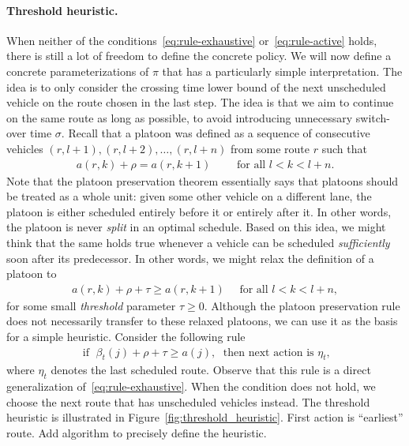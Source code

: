\documentclass[a4paper]{report}
\theoremstyle{definition}
\theoremstyle{plain}
\newcommand\note[1]{{\color{Navy}#1}}
\begin{document}
\paragraph{Threshold heuristic.}
When neither of the conditions~\eqref{eq:rule-exhaustive}
or~\eqref{eq:rule-active} holds, there is still a lot of freedom to define the
concrete policy.
%
We will now define a concrete parameterizations of $\pi$ that has a particularly
simple interpretation.
%
The idea is to only consider the crossing time lower bound of the next
unscheduled vehicle on the route chosen in the last step. The idea is that we
aim to continue on the same route as long as possible, to avoid introducing
unnecessary switch-over time $\sigma$.
%
Recall that a platoon was defined as a sequence of consecutive vehicles
$(r, l+1), (r, l+2), \dots, (r, l+n)$ from some route $r$ such that
\begin{align*}
  a(r,k) + \rho = a(r, k+1)  \quad \quad \text{ for all } l < k < l + n.
\end{align*}
%
Note that the platoon preservation theorem essentially says that platoons should
be treated as a whole unit: given some other vehicle on a different lane, the
platoon is either scheduled entirely before it or entirely after it. In other
words, the platoon is never \emph{split} in an optimal schedule.
Based on this idea, we might think that the same holds true whenever a vehicle
can be scheduled \textit{sufficiently} soon after its predecessor.
%
In other words, we might relax the definition of a platoon to
\begin{align}
  a(r,k) + \rho + \tau \geq a(r, k + 1) \quad \text{ for all } l < k < l + n,
\end{align}
for some small \emph{threshold} parameter $\tau \geq 0$.
%
Although the platoon preservation rule does not necessarily transfer to these
relaxed platoons, we can use it as the basis for a simple heuristic.
%
Consider the following rule
\begin{align}
  \text{ if } \; \beta_t(j) + \rho + \tau \geq a(j) , \; \text{ then next action is } \eta_t ,
\end{align}
where $\eta_t$ denotes the last scheduled route. Observe that this rule is a
direct generalization of~\eqref{eq:rule-exhaustive}.
%
When the condition does not hold, we choose the next route that has unscheduled
vehicles instead. The threshold heuristic is illustrated in
Figure~\ref{fig:threshold_heuristic}. \note{First action is ``earliest'' route.
  Add algorithm to precisely define the heuristic.}
\end{document}

